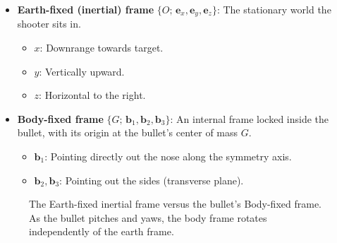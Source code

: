 \documentclass[11pt,twoside,openright]{report}
\begin{document}
\begin{itemize}[noitemsep]
  \item \textbf{Earth-fixed (inertial) frame} $\{O;\,\bm{e}_x, \bm{e}_y, \bm{e}_z\}$: The stationary world the shooter sits in. 
  \begin{itemize}
      \item $x$: Downrange towards target.
      \item $y$: Vertically upward.
      \item $z$: Horizontal to the right.
  \end{itemize}
  \item \textbf{Body-fixed frame} $\{G;\,\bm{b}_1, \bm{b}_2, \bm{b}_3\}$: An internal frame locked inside the bullet, with its origin at the bullet's center of mass $G$. 
  \begin{itemize}
      \item $\bm{b}_1$: Pointing directly out the nose along the symmetry axis.
      \item $\bm{b}_2, \bm{b}_3$: Pointing out the sides (transverse plane).
  \end{itemize}
\end{itemize}

\begin{figure}[H]
\centering
{}
\caption{The Earth-fixed inertial frame versus the bullet's Body-fixed frame. As the bullet pitches and yaws, the body frame rotates independently of the earth frame.}
\label{fig:6dof_frames}
\end{figure}
\end{document}
